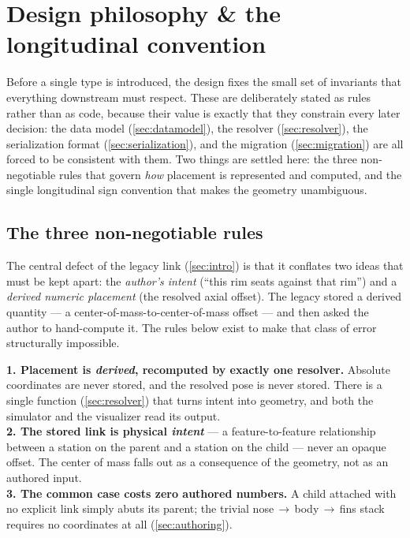 \section{Design philosophy \& the longitudinal convention}\label{sec:philosophy}

Before a single type is introduced, the design fixes the small set of invariants that
everything downstream must respect. These are deliberately stated as rules rather than
as code, because their value is exactly that they constrain every later decision: the
data model (\cref{sec:datamodel}), the resolver (\cref{sec:resolver}), the
serialization format (\cref{sec:serialization}), and the migration (\cref{sec:migration})
are all forced to be consistent with them. Two things are settled here: the three
non-negotiable rules that govern \emph{how} placement is represented and computed, and
the single longitudinal sign convention that makes the geometry unambiguous.

\subsection{The three non-negotiable rules}

The central defect of the legacy link (\cref{sec:intro}) is that it conflates two ideas
that must be kept apart: the \emph{author's intent} (``this rim seats against that rim'')
and a \emph{derived numeric placement} (the resolved axial offset). The legacy
 stored a derived quantity --- a center-of-mass-to-center-of-mass offset ---
and then asked the author to hand-compute it. The rules below exist to make that class of
error structurally impossible.

\begin{designrule}
\textbf{1. Placement is \emph{derived}, recomputed by exactly one resolver.}
Absolute coordinates are never stored, and the resolved pose is never stored. There is a
single function (\cref{sec:resolver}) that turns intent into geometry, and both the
simulator and the visualizer read its output. \\[2pt]
\textbf{2. The stored link is physical \emph{intent}} --- a feature-to-feature relationship
between a station on the parent and a station on the child --- never an opaque offset. The
center of mass falls out as a consequence of the geometry, not as an authored input. \\[2pt]
\textbf{3. The common case costs zero authored numbers.} A child attached with no explicit
link simply abuts its parent; the trivial nose\,$\rightarrow$\,body\,$\rightarrow$\,fins
stack requires no coordinates at all (\cref{sec:authoring}).
\end{designrule}

